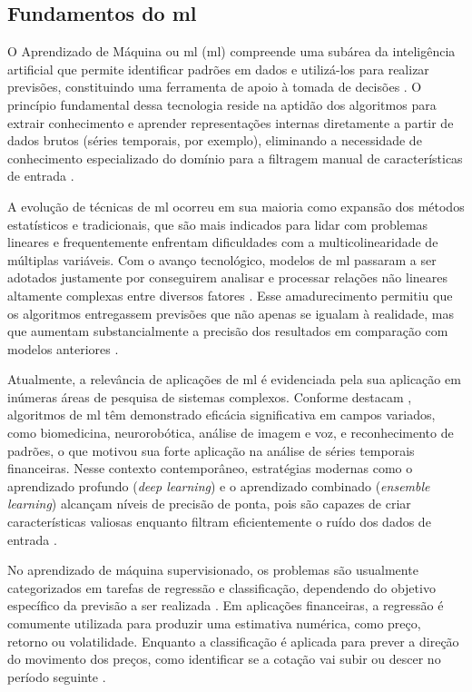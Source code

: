 \subsection{Fundamentos do \acl{ml}}
\label{subsec_fundamentos_do_machine_learning}

O Aprendizado de Máquina ou \acl{ml} (\acs{ml}) compreende uma subárea da inteligência artificial que permite identificar padrões em dados e utilizá-los para realizar previsões, constituindo uma ferramenta de apoio à tomada de decisões \cite{hamayel2021novel}. O princípio fundamental dessa tecnologia reside na aptidão dos algoritmos para extrair conhecimento e aprender representações internas diretamente a partir de dados brutos (séries temporais, por exemplo), eliminando a necessidade de conhecimento especializado do domínio para a filtragem manual de características de entrada \cite{livieris2020ensemble}.

A evolução de técnicas de \acs{ml} ocorreu em sua maioria como expansão dos métodos estatísticos e tradicionais, que são mais indicados para lidar com problemas lineares e frequentemente enfrentam dificuldades com a multicolinearidade de múltiplas variáveis. Com o avanço tecnológico, modelos de \acs{ml} passaram a ser adotados justamente por conseguirem analisar e processar relações não lineares altamente complexas entre diversos fatores \cite{park2023intelligent}. Esse amadurecimento permitiu que os algoritmos entregassem previsões que não apenas se igualam à realidade, mas que aumentam substancialmente a precisão dos resultados em comparação com modelos anteriores \cite{hamayel2021novel}.

Atualmente, a relevância de aplicações de \acl{ml} é evidenciada pela sua aplicação em inúmeras áreas de pesquisa de sistemas complexos. Conforme destacam , algoritmos de \acs{ml} têm demonstrado eficácia significativa em campos variados, como biomedicina, neurorobótica, análise de imagem e voz, e reconhecimento de padrões, o que motivou sua forte aplicação na análise de séries temporais financeiras. Nesse contexto contemporâneo, estratégias modernas como o aprendizado profundo (\textit{deep learning}) e o aprendizado combinado (\textit{ensemble learning}) alcançam níveis de precisão de ponta, pois são capazes de criar características valiosas enquanto filtram eficientemente o ruído dos dados de entrada \cite{livieris2020ensemble}.

No aprendizado de máquina supervisionado, os problemas são usualmente categorizados em tarefas de regressão e classificação, dependendo do objetivo específico da previsão a ser realizada \cite{park2023intelligent}. Em aplicações financeiras, a regressão é comumente utilizada para produzir uma estimativa numérica, como preço, retorno ou volatilidade. Enquanto a classificação é aplicada para prever a direção do movimento dos preços, como identificar se a cotação vai subir ou descer no período seguinte \cite{livieris2020ensemble,derbentsev2021comparative}. 

